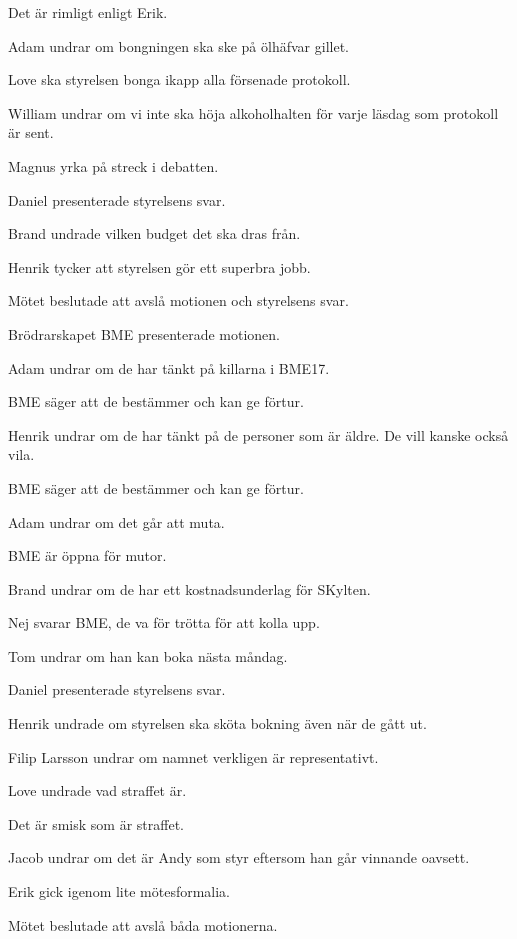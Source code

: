 \documentclass[10pt]{article}
\begin{document}
\begin{paragrafer}
\begin{paragrafer}
		Det är rimligt enligt Erik.

		Adam undrar om bongningen ska ske på ölhäfvar gillet. 

		Love ska styrelsen bonga ikapp alla försenade protokoll.

		William undrar om vi inte ska höja alkoholhalten för varje läsdag som protokoll är sent.
		
		Magnus yrka på streck i debatten.

		Daniel presenterade styrelsens svar. 

		Brand undrade vilken budget det ska dras från. 

		Henrik tycker att styrelsen gör ett superbra jobb. 

		Mötet beslutade att avslå motionen och styrelsens svar. 


		Brödrarskapet BME presenterade motionen. 

		Adam undrar om de har tänkt på killarna i BME17. 

		BME säger att de bestämmer och kan ge förtur.

		Henrik undrar om de har tänkt på de personer som är äldre. De vill kanske också vila.

		BME säger att de bestämmer och kan ge förtur.

		Adam undrar om det går att muta. 

		BME är öppna för mutor. 

		Brand undrar om de har ett kostnadsunderlag för SKylten.

		Nej svarar BME, de va för trötta för att kolla upp. 

		Tom undrar om han kan boka nästa måndag. 

		Daniel presenterade styrelsens svar.

		Henrik undrade om styrelsen ska sköta bokning även när de gått ut. 

		Filip Larsson undrar om namnet verkligen är representativt.  

		Love undrade vad straffet är.

		Det är smisk som är straffet.

		Jacob undrar om det är Andy som styr eftersom han går vinnande oavsett.

		Erik gick igenom lite mötesformalia. 

		Mötet beslutade att avslå båda motionerna. 



\end{paragrafer}
\end{paragrafer}
\end{document}
